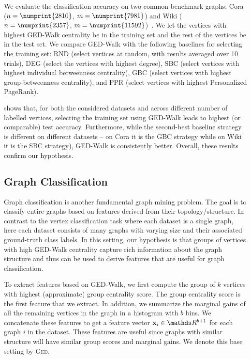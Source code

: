We evaluate the classification accuracy on two common benchmark
graphs: Cora ($n = \numprint{2810}$, $m = \numprint{7981}$) and Wiki ($n = \numprint{2357}$,
$m = \numprint{11592}$)~\cite{sen2008collective}. We let the vertices with highest
GED-Walk centrality be in the training set and the rest of the vertices be in the
test set. We compare GED-Walk with the following baselines for selecting the
training set: RND (select vertices at random, with results averaged over 10 trials),
DEG (select the vertices with highest degree), SBC (select vertices with highest individual
betweenness centrality), GBC (select vertices with highest group-betweenness centrality),
and PPR (select vertices with highest Personalized PageRank).

 shows that, for both the considered datasets and
across different number of labelled vertices, selecting the training set using GED-Walk
leads to highest (or comparable) test accuracy. Furthermore, while the second-best baseline
strategy is different on different datasets -- on Cora it is the GBC strategy while on
Wiki it is the SBC strategy), GED-Walk is consistently better.
Overall, these results confirm our hypothesis.

\subsection{Graph Classification}
%
\begin{table}[tb]
\centering
\footnotesize
{}
\label{tab:ged-walk:graph-class-data-sets}

\end{table}

Graph classification is another fundamental graph mining problem. The goal is to
classify entire graphs based on features derived from their topology/structure.
In contrast to the vertex classification task where each dataset is a single
graph, here each dataset consists of many graphs with varying size and their
associated ground-truth class labels.
In this setting, our hypothesis is that groups of vertices with high
GED-Walk centrality capture rich information about the graph structure and thus
can be used to derive features that are useful for graph classification.

To extract features based on GED-Walk, we first compute the group of $k$ vertices
with highest (approximate) group centrality score. The group centrality score
is the first feature that we extract. In addition, we summarize the marginal gains
of all the remaining vertices in the graph in a histogram with $b$ bins.
We concatenate these features to get a feature vector $\vect{x}_i \in \real^{b + 1}$
for each graph $i$ in the dataset.
These features are useful since graphs with similar structure will have
similar group scores and marginal gains. We denote this base setting by \textsc{Ged}.

